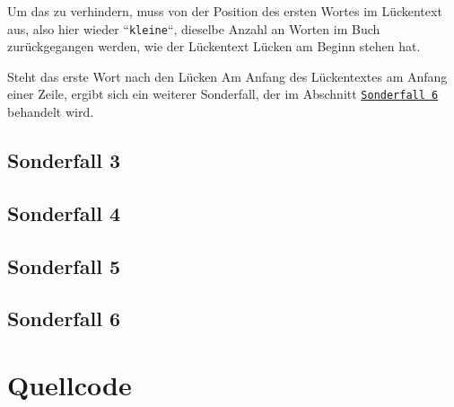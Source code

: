 \documentclass[a4paper, 10pt, ngerman]{scrartcl}
\begin{document}
Um das zu verhindern,
muss von der Position des ersten Wortes im Lückentext aus,
also hier wieder ``\texttt{kleine}``,
dieselbe Anzahl an Worten im Buch zurückgegangen werden,
wie der Lückentext Lücken am Beginn stehen hat.

Steht das erste Wort nach den Lücken Am Anfang des Lückentextes am Anfang einer Zeile,
ergibt sich ein weiterer Sonderfall,
der im Abschnitt \hyperref[sec:sechsterSonderfall]{\texttt{Sonderfall 6}} behandelt wird.

\subsection{Sonderfall 3}\label{sec:dritterSonderfall}

\subsection{Sonderfall 4}\label{sec:vierterSonderfall}

\subsection{Sonderfall 5}\label{sec:fuenfterSonderfall}

\subsection{Sonderfall 6}\label{sec:sechsterSonderfall}

\clearpage


\section{Quellcode}\label{sec:quellcode}
\end{document}
